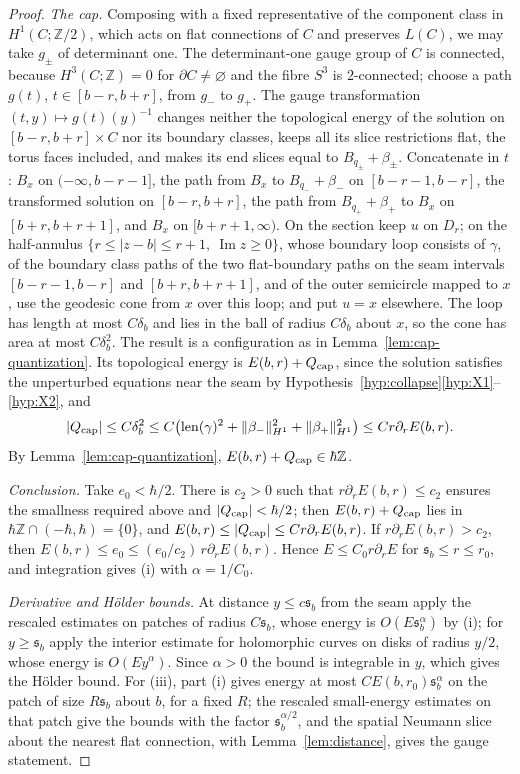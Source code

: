 \documentclass[11pt]{amsart}
\theoremstyle{definition}
\theoremstyle{remark}
\theoremstyle{plain}
\numberwithin{equation}{section}
\newcommand{\len}{\operatorname{len}}
\newcommand{\ZZ}{\mathbb{Z}}
\begin{document}
\begin{proof}
\emph{The cap.} Composing with a fixed representative of the component class in
$H^1(C;\ZZ/2)$, which acts on flat connections of $C$ and preserves $L(C)$, we may take
$g_\pm$ of determinant one. The determinant-one gauge group of $C$ is connected,
because $H^3(C;\ZZ)=0$ for $\partial C\ne\varnothing$ and the fibre $S^3$ is $2$-connected;
choose a path $g(t)$, $t\in[b-r,b+r]$, from $g_-$ to $g_+$. The gauge transformation $(t,y)\mapsto
g(t)(y)^{-1}$ changes neither the topological energy of the solution on $[b-r,b+r]\times C$ nor
its boundary classes, keeps all its slice restrictions flat, the torus faces included, and makes
its end slices equal to $B_{q_\pm}+\beta_\pm$. Concatenate in $t$: $B_x$ on
$(-\infty,b-r-1]$, the path from $B_x$ to $B_{q_-}+\beta_-$ on $[b-r-1,b-r]$, the transformed
solution on $[b-r,b+r]$, the path from $B_{q_+}+\beta_+$ to $B_x$ on $[b+r,b+r+1]$, and $B_x$ on
$[b+r+1,\infty)$. On the section keep $u$ on $D_r$; on the half-annulus $\{r\le|z-b|\le
r+1,\ \operatorname{Im}z\ge0\}$, whose boundary loop consists of $\gamma$, of the boundary class
paths of the two flat-boundary paths on the seam intervals $[b-r-1,b-r]$ and $[b+r,b+r+1]$, and
of the outer semicircle mapped to $x$, use the geodesic cone from $x$ over this loop; and put
$u=x$ elsewhere. The loop has length at most $C\delta_b$ and lies in the ball of radius
$C\delta_b$ about $x$, so the cone has area at most $C\delta_b^2$. The result is a configuration
as in Lemma~\ref{lem:cap-quantization}. Its topological energy is $E(b,r)+Q_{\rm cap}$, since
the solution satisfies the unperturbed equations near the seam by
Hypothesis~\ref{hyp:collapse}\ref{hyp:X1}--\ref{hyp:X2}, and
\[
|Q_{\rm cap}|\le C\delta_b^2\le C\bigl(\len(\gamma)^2+\|\beta_-\|_{H^1}^2+\|\beta_+\|^2_{H^1}\bigr)
\le Cr\partial_rE(b,r).
\]
By Lemma~\ref{lem:cap-quantization}, $E(b,r)+Q_{\rm cap}\in\hbar\ZZ$.

\emph{Conclusion.} Take $e_0<\hbar/2$. There is $c_2>0$ such that $r\partial_rE(b,r)\le c_2$
ensures the smallness required above and $|Q_{\rm cap}|<\hbar/2$; then $E(b,r)+Q_{\rm cap}$
lies in $\hbar\ZZ\cap(-\hbar,\hbar)=\{0\}$, and $E(b,r)\le|Q_{\rm cap}|\le Cr\partial_rE(b,r)$.
If $r\partial_rE(b,r)>c_2$, then $E(b,r)\le e_0\le(e_0/c_2)\,r\partial_rE(b,r)$. Hence
$E\le C_0r\partial_rE$ for ${\mathfrak s}_b\le r\le r_0$, and integration gives (i) with
$\alpha=1/C_0$.

\emph{Derivative and Hölder bounds.} At distance $y\le c{\mathfrak s}_b$ from the
seam apply the rescaled estimates on patches of radius $C{\mathfrak s}_b$, whose
energy is $O(E{\mathfrak s}_b^\alpha)$ by (i); for $y\ge{\mathfrak s}_b$ apply the interior
estimate for holomorphic curves on disks of radius $y/2$, whose energy is
$O(Ey^\alpha)$. Since $\alpha>0$ the bound is integrable in $y$, which gives
the Hölder bound. For (iii), part (i) gives energy at most
$CE(b,r_0){\mathfrak s}_b^\alpha$ on the patch of size $R{\mathfrak s}_b$ about $b$, for a fixed
$R$; the rescaled small-energy estimates on that patch give the bounds with
the factor ${\mathfrak s}_b^{\alpha/2}$, and the spatial Neumann slice about the nearest
flat connection, with Lemma~\ref{lem:distance}, gives the gauge statement.
\end{proof}
\end{document}
